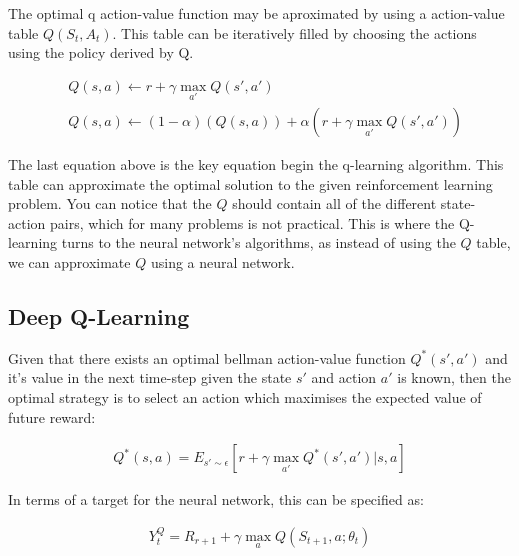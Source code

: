 The optimal q action-value function may be aproximated by using a action-value table $Q(S_{t}, A_{t})$.
This table can be iteratively filled by choosing the actions using the policy derived by Q.

\begin{align}
& Q(s,a) \leftarrow r + \gamma \max_{a'} Q(s',a') \\
& Q(s,a) \leftarrow (1-\alpha)(Q(s,a)) + \alpha(r + \gamma \max_{a'} Q(s',a'))
\label{eq:Qlearning}
\end{align}

The last equation above is the key equation begin the q-learning algorithm.
This table can approximate the optimal solution to the given reinforcement learning problem.
You can notice that the $Q$ should contain all of the different state-action pairs, which for many problems is not practical.
This is where the Q-learning turns to the neural network's algorithms, as instead of using the $Q$ table, we can approximate $Q$ using a neural network.


\subsection{Deep Q-Learning}
\label{sec:dqn}

Given that there exists an optimal bellman action-value function $Q^{*}(s',a')$ \cite{https://doi.org/10.48550/arxiv.1312.5602} and it's value in the next time-step given the state $s'$ and action $a'$ is known, then the optimal strategy is to select an action which maximises the expected value of future reward:

\begin{align}
  Q^{*}(s,a) = E_{s' \sim \epsilon} \left[ r + \gamma \max_{a'} Q^{*}(s',a') \bigg| s,a \right]
\label{eq:deepQlearning}
\end{align}

In terms of a target for the neural network, this can be specified as:

\begin{align}
 Y_{t}^{Q} =  R_{r+1} + \gamma \max_{a} Q(S_{t+1},a; \theta_{t})
\label{eq:deepQlearningTarget}
\end{align}

